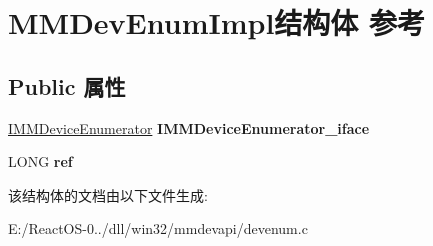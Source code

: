 \hypertarget{struct_m_m_dev_enum_impl}{}\section{M\+M\+Dev\+Enum\+Impl结构体 参考}
\label{struct_m_m_dev_enum_impl}
\subsection*{Public 属性}
\begin{DoxyCompactItemize}
\item 
\mbox{\label{struct_m_m_dev_enum_impl_a5577b34ab8c94fe25f58a8dac66ffe6b}} 
\hyperlink{interface_i_m_m_device_enumerator}{I\+M\+M\+Device\+Enumerator} {\bfseries I\+M\+M\+Device\+Enumerator\+\_\+iface}
\item 
\mbox{\label{struct_m_m_dev_enum_impl_a61b8fb62e15ec63a66d524d3e138b320}} 
L\+O\+NG {\bfseries ref}
\end{DoxyCompactItemize}


该结构体的文档由以下文件生成\+:\begin{DoxyCompactItemize}
\item 
E\+:/\+React\+O\+S-\/0../dll/win32/mmdevapi/devenum.\+c\end{DoxyCompactItemize}
